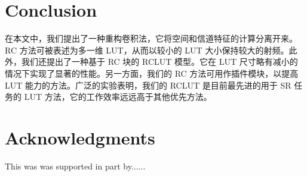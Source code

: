 \documentclass[a4paper]{article}
\begin{document}
\section{Conclusion}
在本文中，我们提出了一种重构卷积法，它将空间和信道特征的计算分离开来。RC 方法可被表述为多一维 LUT，从而以较小的 LUT 大小保持较大的射频。此外，我们还提出了一种基于 RC 块的 RCLUT 模型。它在 LUT 尺寸略有减小的情况下实现了显著的性能。另一方面，我们的 RC 方法可用作插件模块，以提高 LUT 能力的方法。广泛的实验表明，我们的 RCLUT 是目前最先进的用于 SR 任务的 LUT 方法，它的工作效率远远高于其他优先方法。


\section*{Acknowledgments}
This was was supported in part by......

  
  
\end{document}
